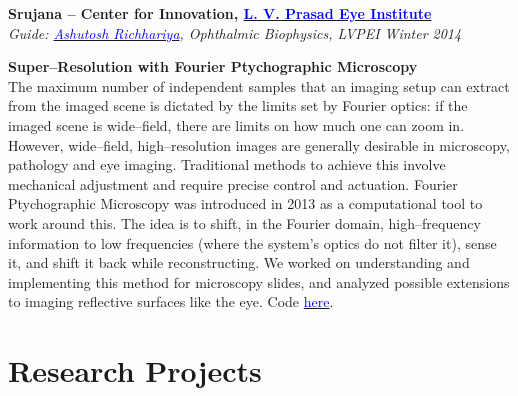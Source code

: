 \documentclass[margin,line]{res}
\newenvironment{list1}{
  \begin{list}{\ding{113}}{%
      \setlength{\itemsep}{0in}
      \setlength{\parsep}{0in} \setlength{\parskip}{0in}
      \setlength{\topsep}{0in} \setlength{\partopsep}{0in} 
      \setlength{\leftmargin}{0.17in}}}{\end{list}}
\begin{document}
\begin{resume}
{\bf Srujana -- Center for Innovation, \href{http://www.lvpei.org/}{\textcolor{blue}{L. V. Prasad Eye Institute}}} \\
{\em Guide: \href{http://www.lvpei.org/our-team/our-team-ashutosh.php}{\textcolor{blue}{Ashutosh Richhariya}}, Ophthalmic Biophysics, LVPEI} \hfill {\it Winter 2014} \\
\vspace*{-.13in}
\begin{list1}
\item[]\textbf{Super--Resolution with Fourier Ptychographic Microscopy} \\
The maximum number of independent samples that an imaging setup can extract from the imaged scene is dictated by the limits set by Fourier optics: if the imaged scene is wide--field, there are limits on how much one can zoom in. However, wide--field, high--resolution images are generally desirable in microscopy, pathology and eye imaging. Traditional methods to achieve this involve mechanical adjustment and require precise control and actuation. Fourier Ptychographic Microscopy was introduced in 2013 as a computational tool to work around this. The idea is to shift, in the Fourier domain, high--frequency information to low frequencies (where the system's optics do not filter it), sense it, and shift it back while reconstructing. We worked on understanding and implementing this method for microscopy slides, and analyzed possible extensions to imaging reflective surfaces like the eye.
Code \href{https://github.com/alankarkotwal/lvp-imaging/tree/parallel}{\textcolor{blue} {here}}.
\end{list1}

\vspace{-.1cm}

\section{\sc Research Projects}


\end{resume}
\end{document}
